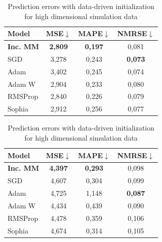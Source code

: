 \documentclass{article}
\begin{document}
\begin{table}[H]
\centering
\begin{minipage}{0.45\textwidth}
    \centering
    \caption{Estimation errors with data-driven initialization for high dimensional simulated data}
    \begin{tabular}{|l|c|c|c|}
\hline
\textbf{Model} & \textbf{MSE$\downarrow$} & \textbf{MAPE$\downarrow$} & \textbf{NMRSE$\downarrow$} \\
\hline
\textbf{Inc. MM} & \textbf{2,809} & \textbf{0,197} & 0,081 \\


SGD & 3,278 & 0,243 & \textbf{0,073} \\

Adam & 3,402 & 0,245 & 0,074 \\

Adam W & 2,904 & 0,233 & 0,080 \\

RMSProp & 2,840 & 0,226 & 0,079 \\

Sophia & 2,912 & 0,256 & 0,077 \\
\hline
\end{tabular}

    \label{tab_Kmean_tm_hidime}
\end{minipage}\hfill
\begin{minipage}{0.45\textwidth}
    \centering
    \caption{Prediction errors with data-driven initialization for high dimensional simulation data}
    \begin{tabular}{|l|c|c|c|}
\hline
\textbf{Model} & \textbf{MSE$\downarrow$} & \textbf{MAPE$\downarrow$} & \textbf{NMRSE$\downarrow$} \\
\hline
\textbf{Inc. MM} & \textbf{4,397} & \textbf{0,293} & 0,098 \\
SGD & 4,607 & 0,304 & 0,099 \\

Adam & 4,725 & 1,148 & \textbf{0,087} \\

Adam W & 4,434 & 0,439 & 0,090 \\

RMSProp & 4,478 & 0,359 & 0,106 \\

Sophia & 4,674 & 0,314 & 0,105 \\
\hline
\end{tabular}

    \label{tab_Kmean_tt_hidime}
\end{minipage}
\end{table}
\end{document}

